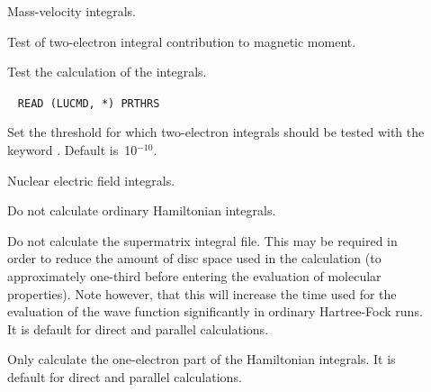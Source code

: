 \begin{description}
\item[] Mass-velocity integrals.


\item[] Test of two-electron integral contribution to
magnetic moment.

\item[] Test the calculation of the 
integrals.

\item[]\verb| |\newline
\verb|READ (LUCMD, *) PRTHRS|

Set the threshold for which two-electron integrals should be tested
 with the keyword . Default is~10$^{-10}$.

\item[] Nuclear electric field integrals.


\item[] Do not calculate ordinary Hamiltonian integrals.

\item[] Do not calculate the supermatrix
integral file.
This may be required in order to reduce the amount of disc space used
in the calculation (to approximately one-third before entering the
evaluation of molecular properties).
Note however, that this will increase the time used for the evaluation
of the wave function
significantly in ordinary Hartree-Fock runs. It is default for direct and
parallel calculations.

\item[] Only calculate the one-electron part of the
Hamiltonian integrals. It is default for direct and parallel calculations.


\end{description}
